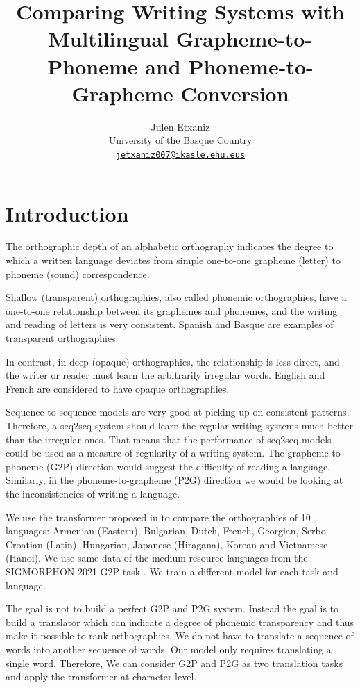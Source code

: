 \documentclass[11pt,a4paper]{article}
\title{Comparing Writing Systems with Multilingual Grapheme-to-Phoneme and Phoneme-to-Grapheme Conversion}
\author{Julen Etxaniz \\
  University of the Basque Country\\
  \texttt{\href{mailto:jetxaniz007@ikasle.ehu.eus}{jetxaniz007@ikasle.ehu.eus}}}
\date{}
\begin{document}
\maketitle
\begin{abstract}

\end{abstract}

\section{Introduction}

The orthographic depth of an alphabetic orthography indicates the degree to which a written language deviates from simple one-to-one grapheme (letter) to phoneme (sound) correspondence. 

Shallow (transparent) orthographies, also called phonemic orthographies, have a one-to-one relationship between its graphemes and phonemes, and the writing and reading of letters is very consistent. Spanish and Basque are examples of transparent orthographies.

In contrast, in deep (opaque) orthographies, the relationship is less direct, and the writer or reader must learn the arbitrarily irregular words. English and French are considered to have opaque orthographies.

Sequence-to-sequence models are very good at picking up on consistent patterns. Therefore, a seq2seq system should learn the regular writing systems much better than the irregular ones. That means that the performance of seq2seq models could be used as a measure of regularity of a writing system. The grapheme-to-phoneme (G2P) direction would suggest the difficulty of reading a language. Similarly, in the phoneme-to-grapheme (P2G) direction we would be looking at the inconsistencies of writing a language.

We use the transformer proposed in \citet{wu2021applying} to compare the orthographies of 10 languages: Armenian (Eastern), Bulgarian, Dutch, French, Georgian, Serbo-Croatian (Latin), Hungarian, Japanese (Hiragana), Korean and Vietnamese (Hanoi). We use same data of the medium-resource languages from the SIGMORPHON 2021 G2P task \cite{ashby-etal-2021-results}. We train a different model for each task and language.

The goal is not to build a perfect G2P and P2G system. Instead the goal is to build a translator which can indicate a degree of phonemic transparency and thus make it possible to rank orthographies. We do not have to translate a
sequence of words into another sequence of words. Our model only requires translating a single word. Therefore, We can consider G2P and P2G as two translation tasks and apply the transformer at character level.
\end{document}
